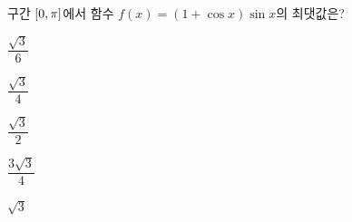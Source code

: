 구간 $[0{,}\mkern3mu\mathopen{}\pi]$에서 함수 $f(x)=(1+\cos x)\sin x$의 최댓값은?
\begin{choices32}{\rule[-3ex]{0pt}{8ex}$\dfrac{\sqrt{3}}{6}$}{\rule[-3ex]{0pt}{8ex}$\dfrac{\sqrt{3}}{4}$}{\rule[-3ex]{0pt}{8ex}$\dfrac{\sqrt{3}}{2}$}{\rule[-3ex]{0pt}{8ex}$\dfrac{3\sqrt{3}}{4}$}{\rule[-3ex]{0pt}{8ex}$\sqrt{3}$}\end{choices32}
